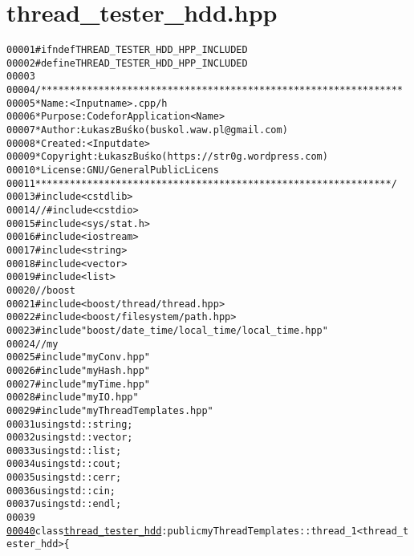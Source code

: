 \hypertarget{thread__tester__hdd_8hpp_source}{
\section{thread\_\-tester\_\-hdd.hpp}
}


\begin{footnotesize}\begin{alltt}
00001 \textcolor{preprocessor}{#ifndef THREAD\_TESTER\_HDD\_HPP\_INCLUDED}
00002 \textcolor{preprocessor}{}\textcolor{preprocessor}{#define THREAD\_TESTER\_HDD\_HPP\_INCLUDED}
00003 \textcolor{preprocessor}{}
00004 \textcolor{comment}{/***************************************************************}
00005 \textcolor{comment}{ * Name:      <Input name>.cpp/h}
00006 \textcolor{comment}{ * Purpose:   Code for Application <Name>}
00007 \textcolor{comment}{ * Author:    Łukasz Buśko (buskol.waw.pl@gmail.com)}
00008 \textcolor{comment}{ * Created:   <Input date>}
00009 \textcolor{comment}{ * Copyright: Łukasz Buśko (https://str0g.wordpress.com)}
00010 \textcolor{comment}{ * License:   GNU / General Public Licens}
00011 \textcolor{comment}{ **************************************************************/}
00013 \textcolor{preprocessor}{#include <cstdlib>}
00014 \textcolor{comment}{//#include <cstdio>}
00015 \textcolor{preprocessor}{#include <sys/stat.h>}
00016 \textcolor{preprocessor}{#include <iostream>}
00017 \textcolor{preprocessor}{#include <string>}
00018 \textcolor{preprocessor}{#include <vector>}
00019 \textcolor{preprocessor}{#include <list>}
00020 \textcolor{comment}{//boost}
00021 \textcolor{preprocessor}{#include <boost/thread/thread.hpp>}
00022 \textcolor{preprocessor}{#include <boost/filesystem/path.hpp>}
00023 \textcolor{preprocessor}{#include "boost/date\_time/local\_time/local\_time.hpp"}
00024 \textcolor{comment}{//my}
00025 \textcolor{preprocessor}{#include "myConv.hpp"}
00026 \textcolor{preprocessor}{#include "myHash.hpp"}
00027 \textcolor{preprocessor}{#include "myTime.hpp"}
00028 \textcolor{preprocessor}{#include "myIO.hpp"}
00029 \textcolor{preprocessor}{#include "myThreadTemplates.hpp"}
00031 \textcolor{keyword}{using} std::string;
00032 \textcolor{keyword}{using} std::vector;
00033 \textcolor{keyword}{using} std::list;
00034 \textcolor{keyword}{using} std::cout;
00035 \textcolor{keyword}{using} std::cerr;
00036 \textcolor{keyword}{using} std::cin;
00037 \textcolor{keyword}{using} std::endl;
00039 
\hypertarget{thread__tester__hdd_8hpp_source_l00040}{}\hyperlink{classthread__tester__hdd}{00040} \textcolor{keyword}{class }\hyperlink{classthread__tester__hdd}{thread_tester_hdd}: \textcolor{keyword}{public} myThreadTemplates::thread\_1<thread\_tester\_hdd>\{

\end{alltt}
\end{footnotesize}
